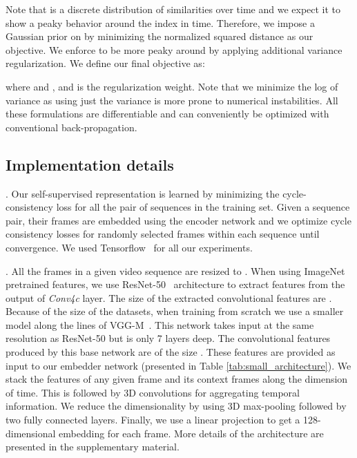 \documentclass[10pt,twocolumn,letterpaper]{article}
\begin{document}
Note that  is a discrete distribution of similarities over time and we expect it to show a peaky behavior around the  index in time. Therefore, we impose a Gaussian prior on  by minimizing the normalized squared distance  as our objective. We enforce  to be more peaky around  by applying additional variance regularization. We define our final objective as:    

where  and , and  is the regularization weight. Note that we minimize the log of variance as using just the variance is more prone to numerical instabilities. All these formulations are differentiable and can conveniently be optimized with conventional back-propagation. 

\subsection{Implementation details}
\label{sec:implementation_details}

. Our self-supervised representation is learned by minimizing the cycle-consistency loss for all the pair of sequences in the training set. Given a sequence pair, their frames are embedded using the encoder network and we optimize cycle consistency losses for randomly selected frames within each sequence until convergence. We used Tensorflow~\cite{abadi2016tensorflow} for all our experiments.

\label{sec:encoding_network}
.  All the frames in a given video sequence are resized to . When using ImageNet pretrained features, we use ResNet-50~\cite{he2016deep} architecture to extract features from the output of \textit{Conv4c} layer. The size of the extracted convolutional features are . Because of the size of the datasets, when training from scratch we use a smaller model along the lines of VGG-M~\cite{chatfield2014return}. This network takes input at the same resolution as ResNet-50 but is only 7 layers deep. The convolutional features produced by this base network are of the size . These features are provided as input to our embedder network (presented in Table \ref{tab:small_architecture}). We stack the features of any given frame and its  context frames along the dimension of time. This is followed by 3D convolutions for aggregating temporal information. We reduce the dimensionality by using 3D max-pooling followed by two fully connected layers. Finally, we use a linear projection to get a 128-dimensional embedding for each frame. More details of the architecture are presented in the supplementary material.
\end{document}
